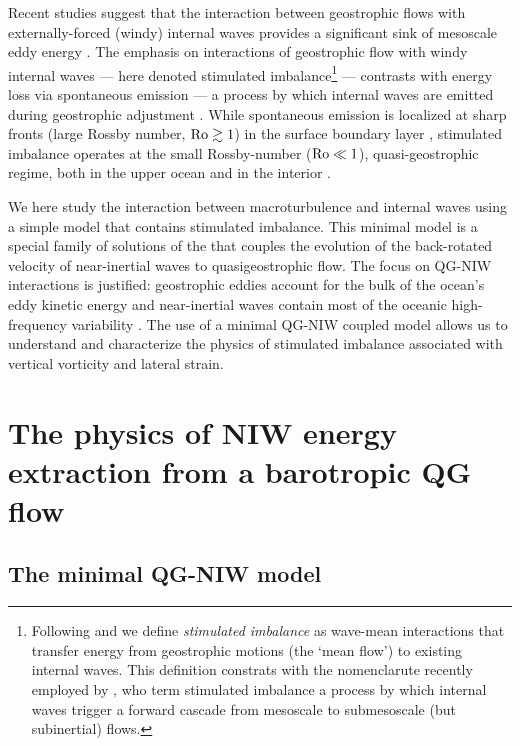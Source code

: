 \documentclass{jfm}
\begin{document}
Recent studies suggest that the interaction
between geostrophic flows with externally-forced (windy) internal waves provides
a significant sink of mesoscale eddy energy
\citep{xie_vanneste2015,taylor_straub2016,wagner_young2016,barkan_etal2016}.
The emphasis on interactions of geostrophic flow with windy internal waves ---
here denoted stimulated imbalance\footnote{Following \cite{xie_vanneste2015} and
\cite{wagner_young2016} we define
\textit{stimulated imbalance} as wave-mean interactions that transfer energy from
geostrophic motions (the `mean flow') to existing internal
waves. This definition constrats with the nomenclarute recently employed by
\cite{barkan_etal2016}, who term stimulated imbalance a process by which
internal waves trigger a forward cascade from mesoscale to submesoscale (but
subinertial) flows.} ---
contrasts with energy loss via spontaneous emission --- a process by which
internal waves are emitted during geostrophic adjustment
\citep[e.g., ][]{shakespeare_hogg2017}. While spontaneous emission is localized
at sharp fronts (large Rossby number, $\mathrm{Ro}\gtrsim 1$) in the surface boundary
layer \citep[e.g., ][]{shakespeare_hogg2017}, stimulated imbalance operates at
the small Rossby-number ($\mathrm{Ro}\ll 1$), quasi-geostrophic regime, both in the upper
ocean and in the interior \citep[e.g., ][]{xie_vanneste2015}.

We here study the interaction between macroturbulence and internal waves using a
simple model that contains stimulated imbalance. This minimal model is a special
family of solutions of the \cite{xie_vanneste2015} that couples the evolution of
the back-rotated velocity of near-inertial waves to quasigeostrophic flow. The
focus on QG-NIW interactions is justified:  geostrophic eddies account for the
bulk of the ocean's eddy kinetic energy \cite[$90\%$,][]{ferrari_wunsch2009} and
near-inertial waves contain most of the oceanic high-frequency variability
\citep{alford_etal2016}. The use of a minimal QG-NIW coupled model allows us to
understand and characterize the physics of stimulated imbalance associated
with vertical vorticity and lateral strain.

\section{The physics of NIW energy extraction from a barotropic QG flow}

\subsection{The \cite{xie_vanneste2015} minimal QG-NIW model}
\end{document}
